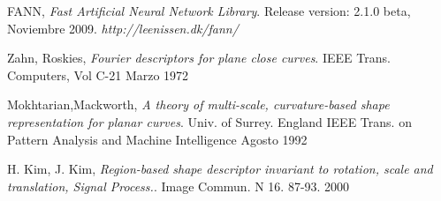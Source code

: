 \documentclass[pdftex,a4paper,10.5pt]{article}
\begin{document}
\begin{thebibliography}{9}
  FANN, 
  \emph{Fast Artificial Neural Network Library}. 
  Release version: 2.1.0 beta, 
  Noviembre 2009.
  \textsl{http://leenissen.dk/fann/}
 
  Zahn, Roskies, 
  \emph{Fourier descriptors for plane close curves}. 
  IEEE Trans. Computers, Vol C-21
  Marzo 1972

 Mokhtarian,Mackworth,
  \emph{A theory of multi-scale, curvature-based shape representation for planar curves}. 
  Univ. of Surrey. England
  IEEE Trans. on Pattern Analysis and Machine Intelligence
  Agosto 1992

  H. Kim, J. Kim,
  \emph{Region-based shape descriptor invariant to rotation, scale and translation, Signal Process.}. 
  Image Commun. N 16. 87-93.
  2000

  
\end{thebibliography}

\end{document}
